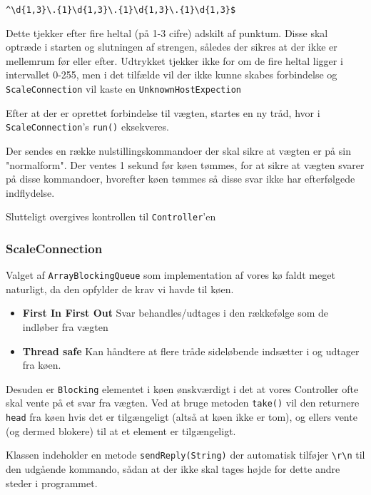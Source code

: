 \documentclass[a4paper]{article}
\begin{document}
\begin{verbatim}
^\d{1,3}\.{1}\d{1,3}\.{1}\d{1,3}\.{1}\d{1,3}$ 
\end{verbatim}

Dette tjekker efter fire heltal (på 1-3 cifre) adskilt af punktum. Disse skal optræde i starten og slutningen af strengen, således der sikres at der ikke er mellemrum før eller efter. Udtrykket tjekker ikke for om de fire heltal ligger i intervallet 0-255, men i det tilfælde vil der ikke kunne skabes forbindelse og \texttt{ScaleConnection} vil kaste en \texttt{UnknownHostExpection}

Efter at der er oprettet forbindelse til vægten, startes en ny tråd, hvor i \texttt{ScaleConnection}'s \texttt{run()} eksekveres.

Der sendes en række nulstillingskommandoer der skal sikre at vægten er på sin "normalform". Der ventes 1 sekund før køen tømmes, for at sikre at vægten svarer på disse kommandoer, hvorefter køen tømmes så disse svar ikke har efterfølgede indflydelse.

Slutteligt overgives kontrollen til \texttt{Controller}'en


\subsubsection{ScaleConnection} %

Valget af \texttt{ArrayBlockingQueue} som implementation af vores kø faldt meget naturligt, da den opfylder de krav vi havde til køen.

\begin{itemize}
  \item \textbf{First In First Out} Svar behandles/udtages i den rækkefølge som de indløber fra vægten
  \item \textbf{Thread safe} Kan håndtere at flere tråde sideløbende indsætter i og udtager fra køen.
\end{itemize}

Desuden er \texttt{Blocking} elementet i køen ønskværdigt i det at vores Controller ofte skal vente på et svar fra vægten. Ved at bruge metoden \texttt{take()} vil den returnere \texttt{head} fra køen hvis det er tilgængeligt (altså at køen ikke er tom), og ellers vente (og dermed blokere) til at et element er tilgængeligt.

Klassen indeholder en metode \texttt{sendReply(String)} der automatisk tilføjer \texttt{\textbackslash r\textbackslash n} til den udgående kommando, sådan at der ikke skal tages højde for dette andre steder i programmet.
\end{document}
